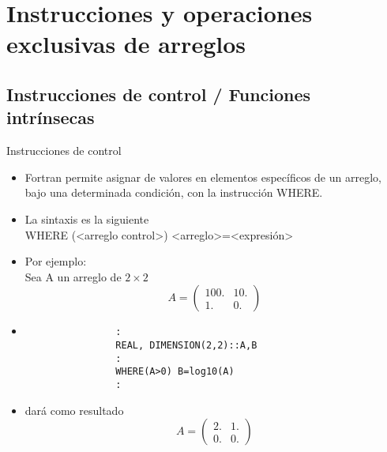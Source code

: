 
\section{Instrucciones y operaciones exclusivas de arreglos}  


\subsection{Instrucciones de control / Funciones intrínsecas}


\begin{frame}[fragile]{Instrucciones de control} 
    \begin{itemize}[<+(0)->]
        \item Fortran permite asignar de valores en elementos específicos de un arreglo, bajo una determinada condición, con la instrucción WHERE. 
        \item La sintaxis es la siguiente \\
            \centering WHERE (<arreglo control>) <arreglo>=<expresión> 
        \item [] Por ejemplo: \\ 
            Sea A un arreglo de $2 \times 2$ 
            $$
                A = \left( \begin{array}{cc}
                    100. & 10. \\
                    1. & 0. \end{array} \right)
            $$
        \item [] 
            \begin{verbatim}
                :
                REAL, DIMENSION(2,2)::A,B
                :
                WHERE(A>0) B=log10(A)
                : 
            \end{verbatim}
        \item [] dará como resultado
            $$
                A = \left( \begin{array}{cc}
                    2. & 1. \\
                    0. & 0. \end{array} \right)
            $$   
    \end{itemize}
\end{frame}


